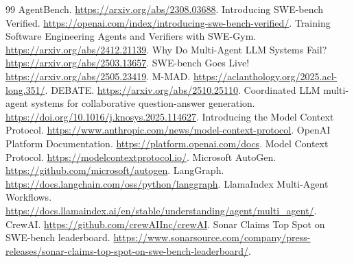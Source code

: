 \documentclass[11pt]{article}
\begin{document}
\begin{thebibliography}{99}
 AgentBench. \url{https://arxiv.org/abs/2308.03688}.
 Introducing SWE-bench Verified. \url{https://openai.com/index/introducing-swe-bench-verified/}.
 Training Software Engineering Agents and Verifiers with SWE-Gym. \url{https://arxiv.org/abs/2412.21139}.
 Why Do Multi-Agent LLM Systems Fail? \url{https://arxiv.org/abs/2503.13657}.
 SWE-bench Goes Live! \url{https://arxiv.org/abs/2505.23419}.
 M-MAD. \url{https://aclanthology.org/2025.acl-long.351/}.
 DEBATE. \url{https://arxiv.org/abs/2510.25110}.
 Coordinated LLM multi-agent systems for collaborative question-answer generation. \url{https://doi.org/10.1016/j.knosys.2025.114627}.
 Introducing the Model Context Protocol. \url{https://www.anthropic.com/news/model-context-protocol}.
 OpenAI Platform Documentation. \url{https://platform.openai.com/docs}.
 Model Context Protocol. \url{https://modelcontextprotocol.io/}.
 Microsoft AutoGen. \url{https://github.com/microsoft/autogen}.
 LangGraph. \url{https://docs.langchain.com/oss/python/langgraph}.
 LlamaIndex Multi-Agent Workflows. \url{https://docs.llamaindex.ai/en/stable/understanding/agent/multi_agent/}.
 CrewAI. \url{https://github.com/crewAIInc/crewAI}.
 Sonar Claims Top Spot on SWE-bench leaderboard. \url{https://www.sonarsource.com/company/press-releases/sonar-claims-top-spot-on-swe-bench-leaderboard/}.
\end{thebibliography}
\end{document}
